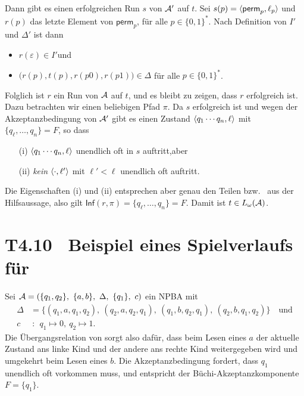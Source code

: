 \documentclass[fontsize=11pt, twoside=false, numbers=autoenddot]{scrbook}
\begin{document}
\begin{description}
    Dann gibt es einen erfolgreichen Run $s$ von $\mathcal{A}'$ auf $t$.
    Sei $s(p) = \langle \textsf{perm}_p,\ell_p\rangle$ 
    und $r(p)$ das letzte Element von $\textsf{perm}_p$,
    für alle $p \in \{0,1\}^*$.
    Nach Definition von $I'$ und $\Delta'$ ist dann
    \begin{itemize}
      \item
        $r(\varepsilon) \in I'$\quad und
      \item
        $\Big(r(p),t(p),r(p0),r(p1)\Big) \in \Delta$ für alle $p \in \{0,1\}^*$.
    \end{itemize}
    Folglich ist $r$ ein Run von $\mathcal{A}$ auf $t$, und es bleibt zu zeigen,
    dass $r$ erfolgreich ist.
    Dazu betrachten wir einen beliebigen Pfad $\pi$.
    Da $s$ erfolgreich ist und wegen der Akzeptanzbedingung von $\mathcal{A}'$
    gibt es einen Zustand $\langle q_1\cdots q_n,\ell\rangle$ mit $\{q_\ell,\dots,q_n\} = F$,
    so dass
    \begin{enumerate}
      \item[(i)]
        $\langle q_1\cdots q_n,\ell\rangle$ unendlich oft in $s$ auftritt,\quad aber
      \item[(ii)]
        \emph{kein} $\langle \cdot,\ell'\rangle$ mit $\ell' < \ell$ unendlich oft auftritt.
    \end{enumerate}
    Die Eigenschaften (i) und (ii) entsprechen aber genau den Teilen
     bzw.\  aus der Hilfsaussage,
    also gilt $\textsf{Inf}(r,\pi) = \{q_\ell,\dots,q_n\}=F$.
    Damit ist $t \in L_\omega(\mathcal{A})$.
    \qedhere
\end{description}

\section*{{\boldmath T4.10~ Beispiel eines Spielverlaufs für }}

Sei 
%
$\mathcal{A} = (\{q_1,q_2\},~\{a,b\},~\Delta,~\{q_1\},~c)$
ein NPBA mit
%
\begin{align*}
  \Delta & = \{(q_1,a,q_1,q_2),~(q_2,a,q_2,q_1),~(q_1,b,q_2,q_1),~(q_2,b,q_1,q_2)\} \quad\text{und} \\
  c      & ~:~~ q_1 \mapsto 0,~ q_2 \mapsto 1.
\end{align*}
%
Die Übergangsrelation von \Amc sorgt also dafür, dass beim Lesen eines $a$
der aktuelle Zustand ans linke Kind und der andere ans rechte Kind weitergegeben wird
und umgekehrt beim Lesen eines $b$. Die Akzeptanzbedingung fordert,
dass $q_1$ unendlich oft vorkommen muss, und entspricht der
Büchi-Akzeptanzkomponente $F = \{q_1\}$.
\end{document}
